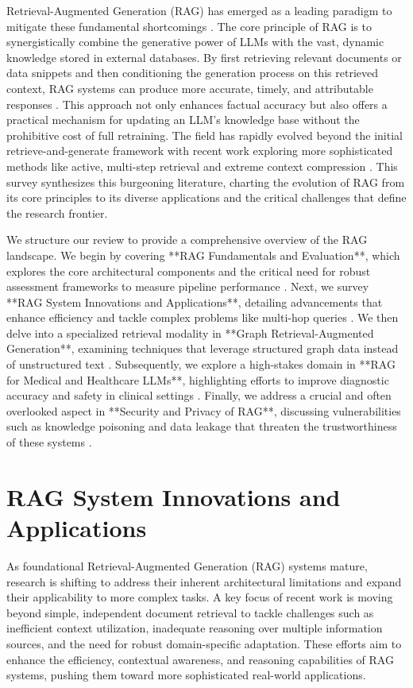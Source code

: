 \documentclass[11pt]{article}
\begin{document}
Retrieval-Augmented Generation (RAG) has emerged as a leading paradigm to mitigate these fundamental shortcomings \cite{ref1}. The core principle of RAG is to synergistically combine the generative power of LLMs with the vast, dynamic knowledge stored in external databases. By first retrieving relevant documents or data snippets and then conditioning the generation process on this retrieved context, RAG systems can produce more accurate, timely, and attributable responses \cite{ref2}. This approach not only enhances factual accuracy but also offers a practical mechanism for updating an LLM's knowledge base without the prohibitive cost of full retraining. The field has rapidly evolved beyond the initial retrieve-and-generate framework \cite{ref1}with recent work exploring more sophisticated methods like active, multi-step retrieval \cite{ref3}and extreme context compression \cite{ref4}. This survey synthesizes this burgeoning literature, charting the evolution of RAG from its core principles to its diverse applications and the critical challenges that define the research frontier.

We structure our review to provide a comprehensive overview of the RAG landscape. We begin by covering **RAG Fundamentals and Evaluation**, which explores the core architectural components and the critical need for robust assessment frameworks to measure pipeline performance \cite{ref5}. Next, we survey **RAG System Innovations and Applications**, detailing advancements that enhance efficiency and tackle complex problems like multi-hop queries \cite{ref6}. We then delve into a specialized retrieval modality in **Graph Retrieval-Augmented Generation**, examining techniques that leverage structured graph data instead of unstructured text \cite{ref7}. Subsequently, we explore a high-stakes domain in **RAG for Medical and Healthcare LLMs**, highlighting efforts to improve diagnostic accuracy and safety in clinical settings . Finally, we address a crucial and often overlooked aspect in **Security and Privacy of RAG**, discussing vulnerabilities such as knowledge poisoning and data leakage that threaten the trustworthiness of these systems .

\section{RAG System Innovations and Applications}
As foundational Retrieval-Augmented Generation (RAG) systems mature, research is shifting to address their inherent architectural limitations and expand their applicability to more complex tasks. A key focus of recent work is moving beyond simple, independent document retrieval to tackle challenges such as inefficient context utilization, inadequate reasoning over multiple information sources, and the need for robust domain-specific adaptation. These efforts aim to enhance the efficiency, contextual awareness, and reasoning capabilities of RAG systems, pushing them toward more sophisticated real-world applications.
\end{document}

